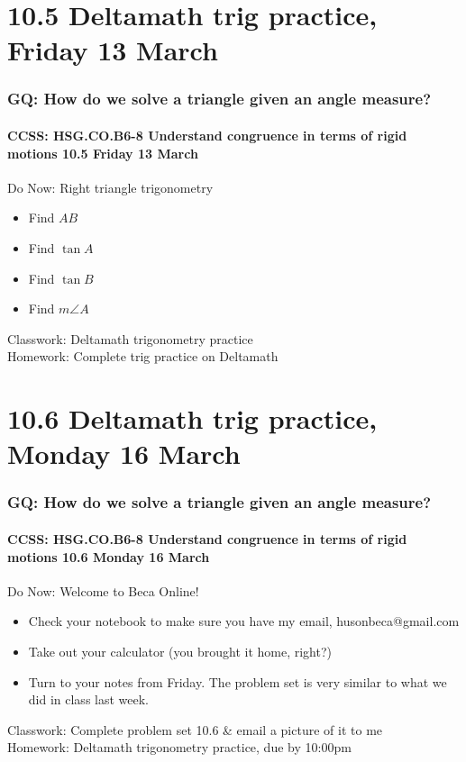 \documentclass{beamer}
\begin{document}
\section{10.5 Deltamath trig practice, Friday 13 March} 
\frame
{
  \frametitle{GQ: How do we solve a triangle given an angle measure?}
  \framesubtitle{CCSS: HSG.CO.B6-8 Understand congruence in terms of rigid motions \hfill \alert{10.5 Friday 13 March}}

  \begin{block}{Do Now: Right triangle trigonometry}
    \begin{multicols}{2}
    \begin{itemize}
      \item Find $AB$
      \item Find $\tan A$
      \item Find $\tan B$
      \item Find $m\angle A$
    \end{itemize}
  \end{multicols}
    \end{block}
    Classwork: Deltamath trigonometry practice \\
    Homework: Complete trig practice on Deltamath
}

\section{10.6 Deltamath trig practice, Monday 16 March} 
\frame
{
  \frametitle{GQ: How do we solve a triangle given an angle measure?}
  \framesubtitle{CCSS: HSG.CO.B6-8 Understand congruence in terms of rigid motions \hfill \alert{10.6 Monday 16 March}}

  \begin{block}{Do Now: Welcome to Beca Online!}
    \begin{itemize}
      \item Check your notebook to make sure you have my email, husonbeca@gmail.com
      \item Take out your calculator (you brought it home, right?)
      \item Turn to your notes from Friday. The problem set is very similar to what we did in class last week.
    \end{itemize}

    \end{block}
    Classwork: Complete problem set 10.6 \& email a picture of it to me \\
    Homework: Deltamath trigonometry practice, due by 10:00pm
}
\end{document}

